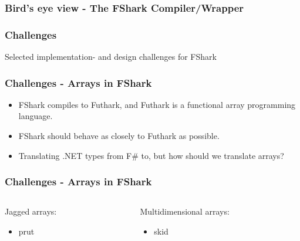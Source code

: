 \documentclass[10pt, compress]{beamer}
\begin{document}
\begin{frame}[fragile]
  \frametitle{Bird's eye view - The FShark Compiler/Wrapper}

\end{frame}
\begin{frame}[plain]
  \frametitle{Challenges}
\begin{center}
  \Huge Selected implementation- and design challenges for FShark
\end{center}

\end{frame}

\begin{frame}[plain]
\frametitle{Challenges - Arrays in FShark}
\begin{itemize}
\item<1-> FShark compiles to Futhark, and Futhark is a functional array programming
language.
\item<2-> FShark should behave as closely to Futhark as possible.
\item<3-> Translating .NET types from F\# to, but how should we translate arrays?
\end{itemize}

\end{frame}

\begin{frame}[plain]
\frametitle{Challenges - Arrays in FShark}
\begin{columns}
  \begin{column}{.48\textwidth}
    Jagged arrays:
    \begin{itemize}
    \item<1-> {\color{red}prut}
    \end{itemize}
  \end{column}
  \begin{column}{.48\textwidth}
    Multidimensional arrays:
    \begin{itemize}
    \item<1-> {\color{green(ryb)}skid}
    \end{itemize}
  \end{column}
\end{columns}

\end{frame}
\end{document}
